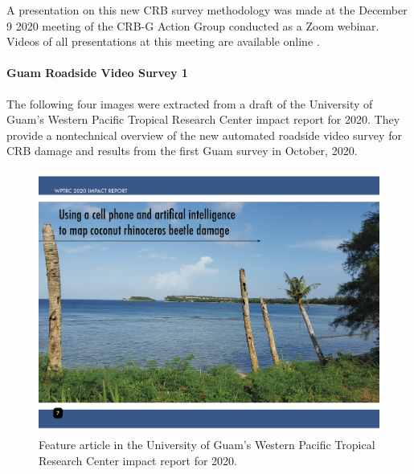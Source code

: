 \documentclass[12pt,letterpaper,english,bibliography=totocnumbered, abstract=on]{scrartcl}
\begin{document}
A presentation on this new CRB survey methodology was made at the December 9 2020 meeting of the CRB-G Action Group conducted as a Zoom webinar. Videos of all presentations at this meeting are available online \cite{mooreVideoRecordingCRBG2020}.

\clearpage
\paragraph{Guam Roadside Video Survey 1}


The following four images were extracted from a draft of the University of Guam's Western Pacific Tropical Research Center impact report for 2020. They provide a nontechnical overview of the new automated roadside video survey for CRB damage and results from the first Guam survey in October, 2020.

\begin{figure}[h]
	\centering
	\includegraphics[width=1\linewidth]{images/impact-report07.png}
	\caption{Feature article in the University of Guam's Western Pacific Tropical Research Center impact report for 2020.}
	\label{fig:roadside1-1}
\end{figure}
\end{document}
